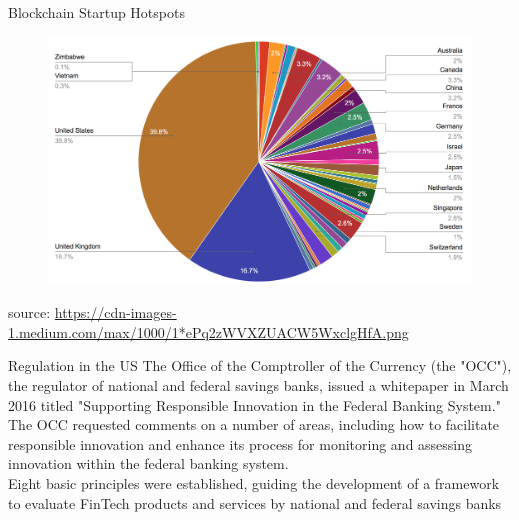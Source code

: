 \documentclass[10pt]{beamer}
\begin{document}
\begin{frame}{Blockchain Startup Hotspots}
	\begin{figure}[]
		\centering
		\includegraphics  [scale=0.2]{Images/startups}
	\end{figure}
	\begin{scriptsize}
		source: \href{https://medium.com/outlier-ventures-io/5-things-we-learned-from-analysing-the-location-of-950-blockchain-startups-96daa788560c}{https://cdn-images-1.medium.com/max/1000/1*ePq2zWVXZUACW5WxclgHfA.png}
	\end{scriptsize}
\end{frame}


\begin{frame}{Regulation in the US}
	The Office of the Comptroller of the Currency (the "OCC"), the regulator of national and federal savings banks, issued a whitepaper in March 2016 titled "Supporting Responsible Innovation in the Federal Banking System." \\ \vspace{3mm}
	The OCC requested comments on a number of areas, including how to facilitate responsible innovation and enhance its process for monitoring and assessing innovation within the federal banking system. \\ \vspace{3mm}
	Eight basic principles were established, guiding the development of a framework to evaluate FinTech products and services by national and federal savings banks
\end{frame}

\end{document}
